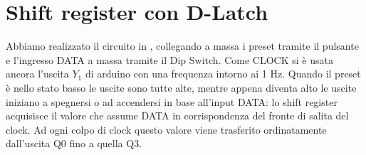 \section{Shift register con D-Latch}
Abbiamo realizzato il circuito in  , collegando a massa i preset tramite il pulsante e l'ingresso DATA a massa tramite il Dip Switch. Come CLOCK si è usata ancora l'uscita $Y_1$ di arduino con una frequenza intorno ai 1 Hz. Quando il preset è nello stato basso le uscite sono tutte alte, mentre appena diventa alto le uscite iniziano a spegnersi o ad accendersi in base all'input DATA: lo shift register acquisisce il valore che assume DATA in corrispondenza del fronte di salita del clock. Ad ogni colpo di clock questo valore viene trasferito ordinatamente dall'uscita Q0 fino a quella Q3.